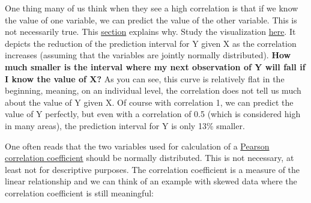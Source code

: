 \documentclass[
]{book}
\begin{document}
One thing many of us think when they see a high correlation is that if we know the value of one variable,
we can predict the value of the other variable. This is not necessarily true.
This \href{https://en.wikipedia.org/wiki/Pearson_correlation_coefficient\#Interpretation}{section} explains why.
Study the visualization \href{https://en.wikipedia.org/wiki/Pearson_correlation_coefficient\#/media/File:Pearson_correlation_and_prediction_intervals.svg}{here}.
It depicts the reduction of the prediction interval for Y given X as the correlation
increases (assuming that the variables are jointly normally distributed). \textbf{How much smaller is the interval where my next observation of Y
will fall if I know the value of X?} As you can see, this curve is relatively flat in the beginning, meaning, on an individual level,
the correlation does not tell us much about the value of Y given X.
Of course with correlation 1, we can predict the value of Y perfectly, but even with a correlation of 0.5
(which is considered high in many areas), the prediction interval for Y is only 13\% smaller.

One often reads that the two variables used for calculation of a
\href{https://en.wikipedia.org/wiki/Pearson_correlation_coefficient}{Pearson correlation coefficient} should be normally distributed.
This is not necessary, at least not for descriptive purposes. The correlation coefficient is a measure of the linear relationship
and we can think of an example with skewed data where the correlation coefficient is still meaningful:
\end{document}
